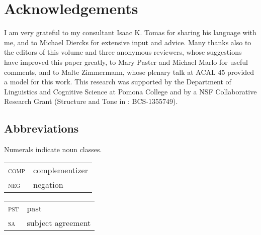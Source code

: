 \documentclass[output=paper]{langsci/langscibook}
\begin{document}
\section*{Acknowledgements}

I am very grateful to my  consultant Isaac K. Tomas for sharing his language with me, and to Michael Diercks for extensive input and advice. Many thanks also to the editors of this volume and three anonymous reviewers, whose suggestions have improved this paper greatly, to Mary Paster and Michael Marlo for useful comments, and to Malte Zimmermann, whose plenary talk at ACAL 45 provided a model for this work. This research was supported by the Department of Linguistics and Cognitive Science at Pomona College and by a NSF Collaborative Research Grant (Structure and Tone in : BCS-1355749).

\subsection*{Abbreviations}

Numerals indicate  noun classes.
\medskip

\begin{tabularx}{.45\textwidth}{lX}
\textsc{comp} &  complementizer  \\
\textsc{neg} &  negation  
\end{tabularx}
\begin{tabularx}{.45\textwidth}{lX}
\textsc{pst} &  past \\
\textsc{sa}  & subject agreement\\
\end{tabularx}



{
\sloppy
\printbibliography[heading=subbibliography,notkeyword=this]
}
\end{document}
